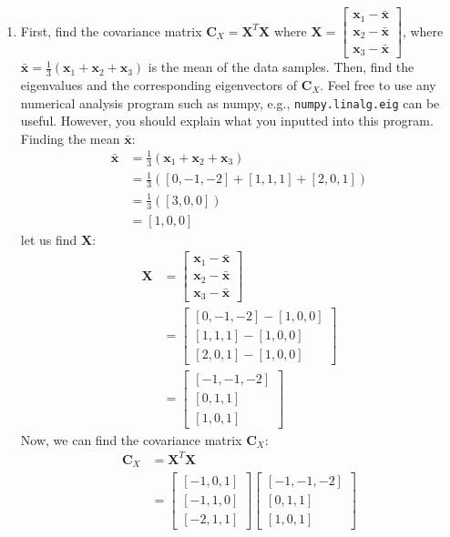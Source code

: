 \documentclass[a3paper,12pt]{extarticle} %
\begin{document}
\begin{enumerate}
\item First, find the covariance matrix $\mathbf{C}_X = \mathbf{X}^T \mathbf{X}$ where $\mathbf{X} = \begin{bmatrix} \mathbf{x}_1 - \bar{\mathbf{x}} \\ \mathbf{x}_2 - \bar{\mathbf{x}} \\ \mathbf{x}_3 - \bar{\mathbf{x}} \end{bmatrix}$, where $\bar{\mathbf{x}} = \frac{1}{3}(\mathbf{x}_1 + \mathbf{x}_2 + \mathbf{x}_3)$ is the mean of the data samples. Then, find the eigenvalues and the corresponding eigenvectors of $\mathbf{C}_X$. Feel free to use any numerical analysis program such as numpy, e.g., \texttt{numpy.linalg.eig} can be useful. However, you should explain what you inputted into this program.
\\ Finding the mean $\bar{\mathbf{x}}$:
\begin{align}
\bar{\mathbf{x}} &= \frac{1}{3}(\mathbf{x}_1 + \mathbf{x}_2 + \mathbf{x}_3)\\
&= \frac{1}{3}([0, -1, -2] + [1, 1, 1] + [2, 0, 1])\\
&= \frac{1}{3}([3, 0, 0])\\
&= [1, 0, 0]
\end{align}
let us find $\mathbf{X}$:
\begin{align}
\mathbf{X} &= \begin{bmatrix} \mathbf{x}_1 - \bar{\mathbf{x}} \\ \mathbf{x}_2 - \bar{\mathbf{x}} \\ \mathbf{x}_3 - \bar{\mathbf{x}} \end{bmatrix}\\
&= \begin{bmatrix} [0, -1, -2] - [1, 0, 0] \\ [1, 1, 1] - [1, 0, 0] \\ [2, 0, 1] - [1, 0, 0] \end{bmatrix}\\
&= \begin{bmatrix} [-1, -1, -2] \\ [0, 1, 1] \\ [1, 0, 1] \end{bmatrix}
\end{align}
Now, we can find the covariance matrix $\mathbf{C}_X$:
\begin{align}
\mathbf{C}_X &=  \mathbf{X}^T \mathbf{X}\\
&=  \begin{bmatrix} [-1, 0, 1] \\ [-1, 1, 0] \\ [-2, 1, 1] \end{bmatrix} \begin{bmatrix} [-1, -1, -2] \\ [0, 1, 1] \\ [1, 0, 1] \end{bmatrix}\\

\end{align}
\end{enumerate}
\end{document}
